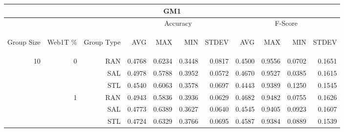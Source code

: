 \begin{center}
\begin{table}[htbp]
\begin{tabular}{ | r | r | r | r | r | r | r | r | r | r | r |}
\hline
\multicolumn{11}{|c|}{GM1}\\
\hline
 & & & \multicolumn{4}{|c|}{Accuracy} & \multicolumn{4}{|c|}{F-Score}\\ \cline{4-11}
\begin{sideways}Group Size\end{sideways} & \begin{sideways}Web1T \%\end{sideways} & \begin{sideways}Group Type\end{sideways} & \begin{sideways}AVG\end{sideways} & \begin{sideways}MAX\end{sideways} & \begin{sideways}MIN\end{sideways} & \begin{sideways}STDEV\end{sideways} & \begin{sideways}AVG\end{sideways} & \begin{sideways}MAX\end{sideways} & \begin{sideways}MIN\end{sideways} & \begin{sideways}STDEV\end{sideways}\\
\hline
\multirow{18}{*}{10}
 & \multirow{3}{*}{0} & RAN & 0.4768 & 0.6234 & 0.3448 & 0.0817 & 0.4500 & 0.9556 & 0.0702 & 0.1651\\ \cline{3-11}
 &   & SAL & 0.4978 & 0.5788 & 0.3952 & 0.0572 & 0.4670 & 0.9527 & 0.0385 & 0.1615\\ \cline{3-11}
 &   & STL & 0.4540 & 0.6063 & 0.3578 & 0.0697 & 0.4443 & 0.9389 & 0.1250 & 0.1545\\ \cline{2-11}
 & \multirow{3}{*}{1} & RAN & 0.4943 & 0.5836 & 0.3936 & 0.0629 & 0.4682 & 0.9482 & 0.0755 & 0.1626\\ \cline{3-11}
 &   & SAL & 0.4773 & 0.6389 & 0.3627 & 0.0640 & 0.4545 & 0.9405 & 0.0923 & 0.1607\\ \cline{3-11}
 &   & STL & 0.4724 & 0.6329 & 0.3766 & 0.0695 & 0.4587 & 0.9384 & 0.0889 & 0.1539\\ \cline{2-11}

\end{tabular}
\end{table}
\end{center}

